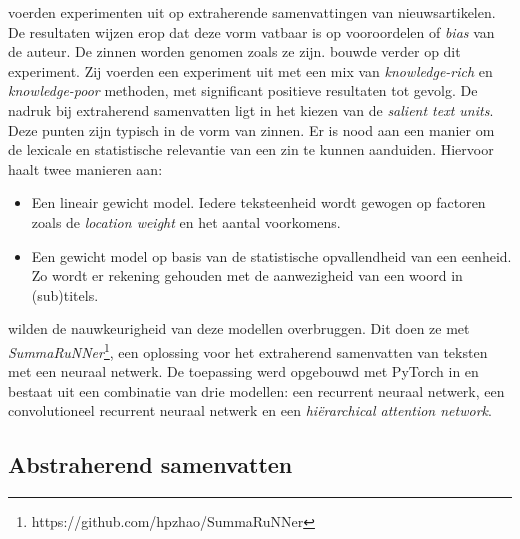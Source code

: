 
\textcite{McKeown1999} voerden experimenten uit op extraherende samenvattingen van nieuwsartikelen. De resultaten wijzen erop dat deze vorm vatbaar is op vooroordelen of \textit{bias} van de auteur. De zinnen worden genomen zoals ze zijn. \textcite{Hahn2000} bouwde verder op dit experiment. Zij voerden een experiment uit met een mix van \textit{knowledge-rich} en \textit{knowledge-poor} methoden, met significant positieve resultaten tot gevolg. De nadruk bij extraherend samenvatten ligt in het kiezen van de \textit{salient text units}. Deze punten zijn typisch in de vorm van zinnen. Er is nood aan een manier om de lexicale en statistische relevantie van een zin te kunnen aanduiden. Hiervoor haalt \textcite{Hahn2000} twee manieren aan:

\begin{itemize}
	\item Een lineair gewicht model. Iedere teksteenheid wordt gewogen op factoren zoals de \textit{location weight} en het aantal voorkomens.
	\item Een gewicht model op basis van de statistische opvallendheid van een eenheid. Zo wordt er rekening gehouden met de aanwezigheid van een woord in (sub)titels.
\end{itemize}


\textcite{Nallapati2017} wilden de nauwkeurigheid van deze modellen overbruggen. Dit doen ze met \textit{SummaRuNNer}\footnote{https://github.com/hpzhao/SummaRuNNer}, een oplossing voor het extraherend samenvatten van teksten met een neuraal netwerk. De toepassing werd opgebouwd met PyTorch in  en bestaat uit een combinatie van drie modellen: een recurrent neuraal netwerk, een convolutioneel recurrent neuraal netwerk en een \textit{hiërarchical attention network}.

\subsection{Abstraherend samenvatten}


